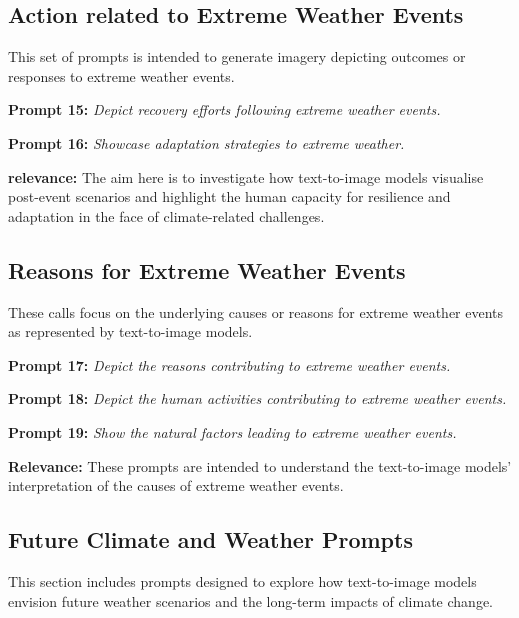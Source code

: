 \subsection{Action related to Extreme Weather Events}
This set of prompts is intended to generate imagery depicting outcomes or responses to extreme weather events.

\begin{description}
\item \textbf{Prompt 15:} \textit{Depict recovery efforts following extreme weather events.}
\item \textbf{Prompt 16:} \textit{Showcase adaptation strategies to extreme weather.}
\end{description}
\textbf{relevance:} The aim here is to investigate how text-to-image models visualise post-event scenarios and highlight the human capacity for resilience and adaptation in the face of climate-related challenges.

\subsection{Reasons for Extreme Weather Events}
These calls focus on the underlying causes or reasons for extreme weather events as represented by text-to-image models.

\begin{description}
\item \textbf{Prompt 17:} \textit{Depict the reasons contributing to extreme weather events.}
\item \textbf{Prompt 18:} \textit{Depict the human activities contributing to extreme weather events.}
\item \textbf{Prompt 19:} \textit{Show the natural factors leading to extreme weather events.}
\end{description}
\textbf{Relevance:} These prompts are intended to understand the text-to-image models' interpretation of the causes of extreme weather events.

\subsection{Future Climate and Weather Prompts}
This section includes prompts designed to explore how text-to-image models envision future weather scenarios and the long-term impacts of climate change.


